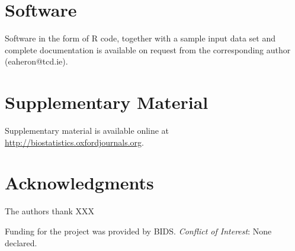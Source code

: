 \documentclass[letterpaper,12pt]{article}
\begin{document}
\section{Software}
\label{sec5}

Software in the form of R code, together with a sample
input data set and complete documentation is available on
request from the corresponding author (eaheron@tcd.ie).


\section{Supplementary Material}
\label{sec6}

Supplementary material is available online at
\url{http://biostatistics.oxfordjournals.org}.


\section*{Acknowledgments}

The authors thank XXX

Funding for the project was provided by BIDS.
{\it Conflict of Interest}: None declared.






\begin{figure}[!p]
\centering
\caption{}
\label{Fig1}
\end{figure}
\end{document}
